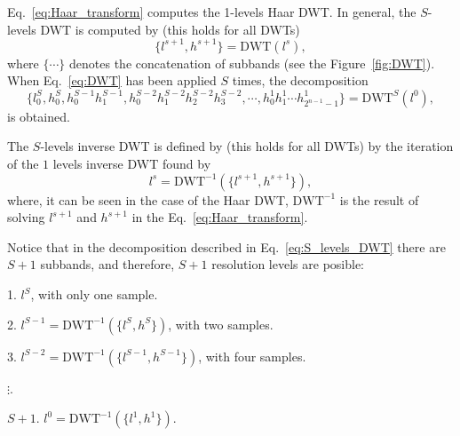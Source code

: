 Eq.~\ref{eq:Haar_transform} computes the 1-levels Haar DWT. In
general, the $S$-levels DWT is computed by (this holds for all DWTs)
\begin{equation}
  \{l^{s+1}, h^{s+1}\} = \text{DWT}(l^s),
  \label{eq:DWT}
\end{equation}
where $\{\cdots\}$ denotes the concatenation of subbands (see the
Figure~\ref{fig:DWT}). When Eq.~\ref{eq:DWT} has been applied $S$
times, the decomposition
\begin{equation}
  \{l^S_0, h^S_0, h^{S-1}_0 h^{S-1}_1, h^{S-2}_0 h^{S-2}_1 h^{S-2}_2
  h^{S-2}_3, \cdots, h^1_0 h^1_1 \cdots
  h^1_{2^{n-1}-1}\}=\text{DWT}^S(l^0),
  \label{eq:S_levels_DWT}
\end{equation}
is obtained.

The $S$-levels inverse DWT is defined by (this holds for all DWTs) by the iteration of the $1$ levels inverse DWT found by
\begin{equation}
  l^s = \text{DWT}^{-1}(\{l^{s+1}, h^{s+1}\}),
\end{equation}
where, it can be seen in the case of the Haar DWT, $\text{DWT}^{-1}$
is the result of solving $l^{s+1}$ and $h^{s+1}$ in the
Eq.~\ref{eq:Haar_transform}.

Notice that in the decomposition described in
Eq.~\ref{eq:S_levels_DWT} there are $S+1$ subbands, and therefore,
$S+1$ resolution levels are posible:
\begin{description}
\item 1. $l^S$, with only one sample.
\item 2. $l^{S-1}=\text{DWT}^{-1}(\{l^S, h^S\})$, with two samples.
\item 3. $l^{S-2}=\text{DWT}^{-1}(\{l^{S-1}, h^{S-1}\})$, with four
  samples.
\item $\vdots$.
\item $S+1$. $l^0=\text{DWT}^{-1}(\{l^1, h^1\})$.
\end{description}  

